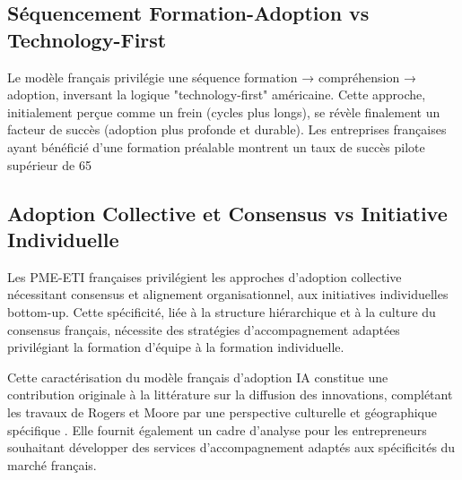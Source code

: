 \subsection{Séquencement Formation-Adoption vs Technology-First}

Le modèle français privilégie une séquence formation → compréhension → adoption, inversant la logique "technology-first" américaine. Cette approche, initialement perçue comme un frein (cycles plus longs), se révèle finalement un facteur de succès (adoption plus profonde et durable). Les entreprises françaises ayant bénéficié d'une formation préalable montrent un taux de succès pilote supérieur de 65%

\subsection{Adoption Collective et Consensus vs Initiative Individuelle}

Les PME-ETI françaises privilégient les approches d'adoption collective nécessitant consensus et alignement organisationnel, aux initiatives individuelles bottom-up. Cette spécificité, liée à la structure hiérarchique et à la culture du consensus français, nécessite des stratégies d'accompagnement adaptées privilégiant la formation d'équipe à la formation individuelle.

Cette caractérisation du modèle français d'adoption IA constitue une contribution originale à la littérature sur la diffusion des innovations, complétant les travaux de Rogers et Moore par une perspective culturelle et géographique spécifique \cite{rogers2003diffusion,moore2014crossing}. Elle fournit également un cadre d'analyse pour les entrepreneurs souhaitant développer des services d'accompagnement adaptés aux spécificités du marché français.